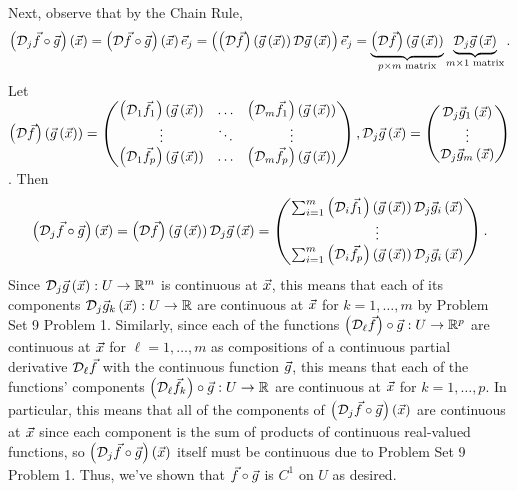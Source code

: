 \documentclass[main.tex]{subfiles}
\begin{document}
\begin{soln}
    Next, observe that by the Chain Rule,
    \[\left( \mathcal{D}_j\vec{f}\circ \vec{g} \right)\left( \vec{x} \right) = \left( \mathcal{D}\vec{f}\circ \vec{g} \right)\left( \vec{x} \right)\vec{e}_j = \left( \left( \mathcal{D}\vec{f} \right)\left( \vec{g}\left( \vec{x} \right) \right) \mathcal{D}\vec{g}\left( \vec{x} \right) \right)\vec{e}_j = \underbrace{\left( \mathcal{D}\vec{f} \right)\left( \vec{g}\left( \vec{x} \right) \right)}_{p\times m \text{ matrix}} \underbrace{\mathcal{D}_j\vec{g}\left( \vec{x} \right)}_{m\times 1 \text{ matrix}}.\]
    Let $\left( \mathcal{D}\vec{f} \right)\left( \vec{g}\left( \vec{x} \right) \right) = \begin{pmatrix}
        \left( \mathcal{D}_1\vec{f}_1 \right)\left( \vec{g}\left( \vec{x} \right) \right) & \ldots & \left( \mathcal{D}_m\vec{f}_1 \right)\left( \vec{g}\left( \vec{x} \right) \right) \\
        \vdots & \ddots & \vdots \\
        \left( \mathcal{D}_1\vec{f}_p \right)\left( \vec{g}\left( \vec{x} \right) \right) & \ldots & \left( \mathcal{D}_m\vec{f}_p \right)\left( \vec{g}\left( \vec{x} \right) \right)
    \end{pmatrix},\mathcal{D}_j\vec{g}\left( \vec{x} \right) = \begin{pmatrix}
        \mathcal{D}_j\vec{g}_1\left( \vec{x} \right) \\
        \vdots \\
        \mathcal{D}_j\vec{g}_m\left( \vec{x} \right)
    \end{pmatrix}$. Then
    \[\left( \mathcal{D}_j\vec{f}\circ \vec{g} \right)\left( \vec{x} \right) = \left( \mathcal{D}\vec{f} \right)\left( \vec{g}\left( \vec{x} \right) \right)\mathcal{D}_j\vec{g}\left( \vec{x} \right) = \begin{pmatrix}
        \sum_{i = 1}^m \left( \mathcal{D}_i\vec{f}_1 \right)\left( \vec{g}\left( \vec{x} \right) \right)\mathcal{D}_j\vec{g}_i\left( \vec{x} \right) \\
        \vdots \\
        \sum_{i = 1}^m \left( \mathcal{D}_i\vec{f}_p \right)\left( \vec{g}\left( \vec{x} \right) \right)\mathcal{D}_j\vec{g}_i\left( \vec{x} \right)
    \end{pmatrix}.\]
    Since $\mathcal{D}_j\vec{g}\left( \vec{x} \right) : U \to \mathbb R^m$ is continuous at $\vec{x}$, this means that each of its components $\mathcal{D}_j\vec{g}_k\left( \vec{x} \right) : U \to \mathbb R$ are continuous at $\vec{x}$ for $k = 1, \ldots , m$ by Problem Set 9 Problem 1. Similarly, since each of the functions $\left( \mathcal{D}_\ell\vec{f} \right)\circ \vec{g} : U \to \mathbb R^p$ are continuous at $\vec{x}$ for $\ell = 1, \ldots , m$ as compositions of a continuous partial derivative $\mathcal{D}_\ell\vec{f}$ with the continuous function $\vec{g}$, this means that each of the functions' components $\left( \mathcal{D}_\ell\vec{f}_k \right)\circ \vec{g} : U \to \mathbb R$ are continuous at $\vec{x}$ for $k = 1, \ldots , p$. In particular, this means that all of the components of $\left( \mathcal{D}_j\vec{f}\circ \vec{g} \right)\left( \vec{x} \right)$ are continuous at $\vec{x}$ since each component is the sum of products of continuous real-valued functions, so $\left( \mathcal{D}_j\vec{f}\circ \vec{g} \right)\left( \vec{x} \right)$ itself must be continuous due to Problem Set 9 Problem 1. Thus, we've shown that $\vec{f} \circ \vec{g}$ is $C^1$ on $U$ as desired.
\end{soln}
\eject
\end{document}
